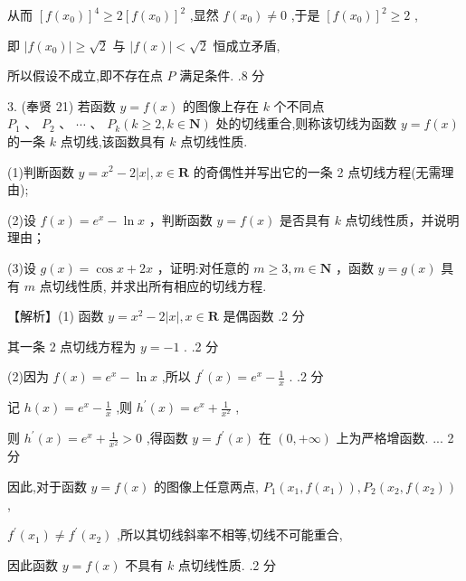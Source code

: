 \documentclass[10pt]{article}
\begin{document}
从而 \({\left\lbrack  f\left( {x}_{0}\right) \right\rbrack  }^{4} \geq  2{\left\lbrack  f\left( {x}_{0}\right) \right\rbrack  }^{2}\) ,显然 \(f\left( {x}_{0}\right)  \neq  0\) ,于是 \({\left\lbrack  f\left( {x}_{0}\right) \right\rbrack  }^{2} \geq  2\) ,

即 \(\left| {f\left( {x}_{0}\right) }\right|  \geq  \sqrt{2}\) 与 \(\left| {f\left( x\right) }\right|  < \sqrt{2}\) 恒成立矛盾,

所以假设不成立,即不存在点 \(P\) 满足条件. .8 分

3. (奉贤 21) 若函数 \(y = f\left( x\right)\) 的图像上存在 \(k\) 个不同点 \({P}_{1}\text{ 、 }{P}_{2}\text{ 、 }\cdots \text{ 、 }{P}_{k}\left( {k \geq  2,k \in  \mathbf{N}}\right)\) 处的切线重合,则称该切线为函数 \(y = f\left( x\right)\) 的一条 \(k\) 点切线,该函数具有 \(k\) 点切线性质.

(1)判断函数 \(y = {x}^{2} - 2\left| x\right| ,x \in  \mathbf{R}\) 的奇偶性并写出它的一条 2 点切线方程(无需理由);

(2)设 \(f\left( x\right)  = {e}^{x} - \ln x\) ，判断函数 \(y = f\left( x\right)\) 是否具有 \(k\) 点切线性质，并说明理由；

(3)设 \(g\left( x\right)  = \cos x + {2x}\) ，证明:对任意的 \(m \geq  3,m \in  \mathbf{N}\) ，函数 \(y = g\left( x\right)\) 具有 \(m\) 点切线性质, 并求出所有相应的切线方程.

【解析】(1) 函数 \(y = {x}^{2} - 2\left| x\right| ,x \in  \mathbf{R}\) 是偶函数 .2 分

其一条 2 点切线方程为 \(y =  - 1\) . .2 分

(2)因为 \(f\left( x\right)  = {e}^{x} - \ln x\) ,所以 \({f}^{\prime }\left( x\right)  = {e}^{x} - \frac{1}{x}\) . .2 分

记 \(h\left( x\right)  = {e}^{x} - \frac{1}{x}\) ,则 \({h}^{\prime }\left( x\right)  = {e}^{x} + \frac{1}{{x}^{2}}\) ,

则 \({h}^{\prime }\left( x\right)  = {e}^{x} + \frac{1}{{x}^{2}} > 0\) ,得函数 \(y = {f}^{\prime }\left( x\right)\) 在 \(\left( {0, + \infty }\right)\) 上为严格增函数. ... 2 分

因此,对于函数 \(y = f\left( x\right)\) 的图像上任意两点, \({P}_{1}\left( {{x}_{1},f\left( {x}_{1}\right) }\right) ,{P}_{2}\left( {{x}_{2},f\left( {x}_{2}\right) }\right)\) ,

\({f}^{\prime }\left( {x}_{1}\right)  \neq  {f}^{\prime }\left( {x}_{2}\right)\) ,所以其切线斜率不相等,切线不可能重合,

因此函数 \(y = f\left( x\right)\) 不具有 \(k\) 点切线性质. .2 分
\end{document}
